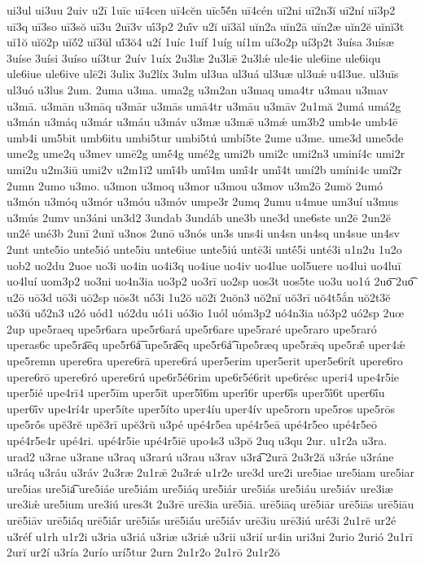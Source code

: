 {ui3ul
ui3uu
2uiv
u2ī
1uīc
uī4cen
uī4cĕn
uīc5ĕ́n
uī4cén
uī2ni
uī2n3ĭ
uī2ní
uī3p2
uī3q
uī3so
uī3sŏ
uī3u
2uī3v
uī́3p2
2uī́v
u2ĭ
uĭ3ăl
uĭn2a
uĭn2ā
uĭn2æ
uĭn2ĕ
uĭnĭ3t
uĭ1ŏ
uĭŏ2p
uĭŏ́2
uĭ3ŭl
uĭ́3ŏ4
u2í
1uíc
1uíf
1uíg
uí1m
uí3o2p
uí3p2t
3uísa
3uísæ
3uíse
3uísi
3uíso
uí3tur
2uív
1uíx
2u3læ
2u3lǣ
2u3lǽ
ule4ie
ule6ine
ule6iqu
ule6iue
ule6ive
ulē2i
3ulix
3u2líx
3ulm
ul3ua
ul3uá
ul3uæ
ul3uǽ
u4l3ue.
ul3uīs
ul3uó
u3lus
2um.
2uma
u3ma.
uma2g
u3m2an
u3maq
uma4tr
u3mau
u3mav
u3mā.
u3mān
u3māq
u3mār
u3mās
umā4tr
u3māu
u3māv
2u1mă
2umá
umá2g
u3mán
u3máq
u3már
u3máu
u3máv
u3mæ
u3mǣ
u3mǽ
um3b2
umb4e
umb4ē
umb4i
um5bit
umb6itu
umbi5tur
umbi5tú
umbí5te
2ume
u3me.
ume3d
ume5de
ume2g
ume2q
u3mev
umē2g
umḗ4g
umé2g
umi2b
umi2c
umi2n3
uminí4c
umi2r
umi2u
u2m3iū
umi2v
u2m1ī2
umī́4b
umī́4m
umī́4r
umī́4t
umí2b
umíni4c
umí2r
2umn
2umo
u3mo.
u3mon
u3moq
u3mor
u3mou
u3mov
u3m2ō
2umŏ
2umó
u3món
u3móq
u3mór
u3móu
u3móv
umpe3r
2umq
2umu
u4mue
um3uí
u3mus
u3mús
2umv
un3áni
un3d2
3undab
3undáb
une3b
une3d
une6ste
un2ē
2un2ĕ
un2é
uné3b
2unī
2unĭ
u3nos
2unō
u3nós
un3s
uns4i
un4sn
un4sq
un4sue
un4sv
2unt
unte5io
unte5ió
unte5iu
unte6iue
unte5iú
untē3i
untḗ5i
unté3i
u1n2u
1u2o
uob2
uo2du
2uoe
uo3i
uo4in
uo4i3q
uo4iue
uo4iv
uo4lue
uol5uere
uo4lui
uo4luī
uo4luí
uom3p2
uo3ni
uo4n3ia
uo3p2
uo3rī
uo2sp
uos3t
uos5te
uo3u
uo1ú
2uo͞
2uo͡
u2ō
uō3d
uō3i
uō2sp
uōs3t
uṓ3i
1u2ŏ
uŏ2ĭ
2uŏn3
uŏ2nĭ
uŏ3rī
uŏ4t5ắn
uŏ2t3ĕ
uŏ3ŭ
uŏ́2n3
u2ó
uód1
uó2du
uó1i
uó3io
1uól
uóm3p2
uó4n3ia
uó3p2
uó2sp
2uœ
2up
upe5raeq
upe5r6ara
upe5r6ará
upe5r6are
upe5raré
upe5raro
upe5raró
uperas6c
upe5ra͞eq
upe5r6á͞
upe5ra͡eq
upe5r6á͡
upe5ræq
upe5rǣq
upe5rǣ́
uper4ǽ
upe5remn
upere6ra
upere6rā
upere6rá
uper5erim
uper5erit
uper5e6rít
upere6ro
upere6rō
upere6ró
upere6rú
upe6r5é6rim
upe6r5é6rit
upe6résc
uperi4
upe4r5ie
uper5ié
upe4rī4
uper5īm
uper5īt
uper5ī́6m
uperī́6r
uper6ī́s
uper5ī́6t
uper6ī́u
uper6ī́v
upe4rí4r
uper5íte
uper5íto
uper4íu
uper4ív
upe5rorn
upe5ros
upe5rōs
upe5rṓs
upĕ3rĕ
upĕ3rī
upĕ3rŭ
u3pé
upé4r5ea
upé4r5eā
upé4r5eo
upé4r5eō
upé4r5e4r
upé4ri.
upé4r5ie
upé4r5iē
upo4s3
u3pŏ
2uq
u3qu
2ur.
u1r2a
u3ra.
urad2
u3rae
u3rane
u3raq
u3rarú
u3rau
u3rav
u3ra͡
2urā
2u3r2ă
u3ráe
u3ráne
u3ráq
u3ráu
u3ráv
2u3ræ
2u1rǣ
2u3rǽ
u1r2e
ure3d
ure2i
ure5iae
ure5iam
ure5iar
ure5ias
ure5ia͡
ure5iáe
ure5iám
ure5iáq
ure5iár
ure5iás
ure5iáu
ure5iáv
ure3iæ
ure3iǽ
ure5ium
ure3iú
ures3t
2u3rē
urē3ia
urē5iā.
urē5iāq
urē5iār
urē5iās
urē5iāu
urē5iāv
urē5iā́q
urē5iā́r
urē5iā́s
urē5iā́u
urē5iā́v
urē3iu
urē3iú
urḗ3i
2u1rĕ
ur2é
u3réf
u1rh
u1r2i
u3ria
u3riá
u3riæ
u3riǽ
u3rii
u3rií
ur4in
uri3ni
2urio
2urió
2u1rī
2urĭ
ur2í
u3ría
2urío
urí5tur
2urn
2u1r2o
2u1rō
2u1r2ŏ
}
